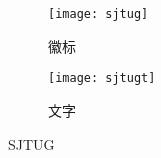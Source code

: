 \documentclass{ctexart}
\begin{document}
  \begin{figure}[ht]
    \begin{subfigure}{0.48\textwidth}
      \centering
      \texttt{[image: sjtug]}
      \caption{徽标}
    \end{subfigure}\hfill
    \begin{subfigure}{0.48\textwidth}
      \centering
      \texttt{[image: sjtugt]}
      \caption{文字}
    \end{subfigure}
    \caption{SJTUG}\label{fig:sjtug}
  \end{figure}
\end{document}

